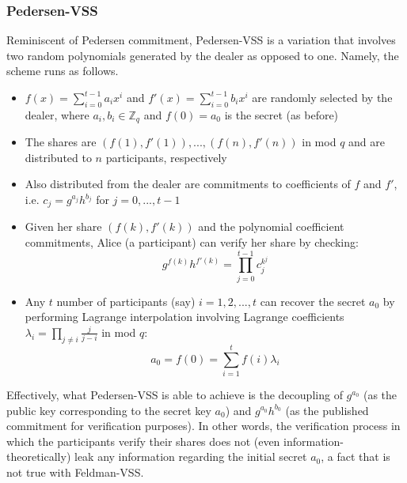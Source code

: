 \documentclass[11pt]{article}
\theoremstyle{definition}
\theoremstyle{remark}
\begin{document}
\subsubsection{Pedersen-VSS}
Reminiscent of Pedersen commitment, Pedersen-VSS is a variation that involves two random polynomials generated by the dealer as opposed to one. Namely, the scheme runs as follows.

\begin{itemize}
\item $f(x) = \sum_{i = 0}^{t - 1} a_i x^i$ and $f'(x) = \sum_{i = 0}^{t - 1} b_i x^i$ are randomly selected by the dealer, where $a_i, b_i \in \mathbb{Z}_q$ and $f(0) = a_0$ is the secret (as before)
\item The shares are $(f(1), f'(1)), ..., (f(n), f'(n))$ in mod $q$ and are distributed to $n$ participants, respectively
\item Also distributed from the dealer are commitments to coefficients of $f$ and $f'$, i.e. $c_j = g^{a_j} h^{b_j}$ for $j = 0, ..., t - 1$
\item Given her share $(f(k), f'(k))$ and the polynomial coefficient commitments, Alice (a participant) can verify her share by checking:
$$g^{f(k)} h^{f'(k)} = \prod_{j = 0}^{t - 1} c_j^{k^j}$$
\item Any $t$ number of participants (say) $i = 1, 2, ..., t$ can recover the secret $a_0$ by performing Lagrange interpolation involving Lagrange coefficients $\lambda_i = \prod_{j \neq i} \frac{j}{j - i}$ in mod $q$:
$$a_0 = f(0) = \sum_{i = 1}^{t} f(i) \lambda_i$$
\end{itemize}

Effectively, what Pedersen-VSS is able to achieve is the decoupling of $g^{a_0}$ (as the public key corresponding to the secret key $a_0$) and $g^{a_0} h^{b_0}$ (as the published commitment for verification purposes). In other words, the verification process in which the participants verify their shares does not (even information-theoretically) leak any information regarding the initial secret $a_0$, a fact that is not true with Feldman-VSS.



\end{document}
